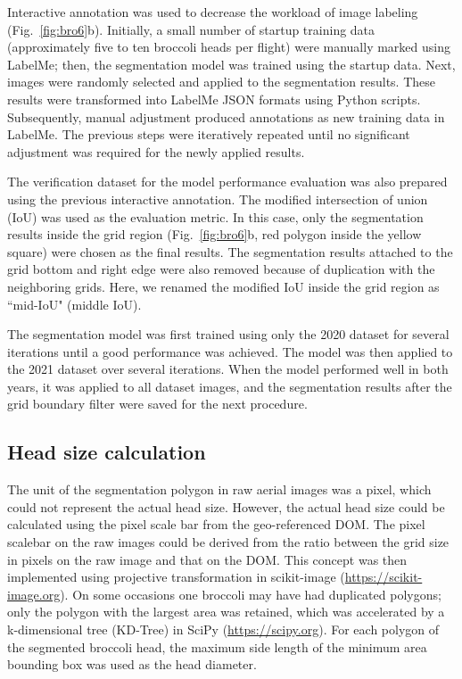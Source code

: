 Interactive annotation was used to decrease the workload of image labeling \linebreak (Fig.~\ref{fig:bro6}b). Initially, a small number of startup training data (approximately five to ten broccoli heads per flight) were manually marked using LabelMe; then, the segmentation model was trained using the startup data. Next, images were randomly selected and applied to the segmentation results. These results were transformed into LabelMe JSON formats using Python scripts. Subsequently, manual adjustment produced annotations as new training data in LabelMe. The previous steps were iteratively repeated until no significant adjustment was required for the newly applied results.

The verification dataset for the model performance evaluation was also prepared using the previous interactive annotation. The modified intersection of union (IoU) was used as the evaluation metric. In this case, only the segmentation results inside the grid region (Fig.~\ref{fig:bro6}b, red polygon inside the yellow square) were chosen as the final results. The segmentation results attached to the grid bottom and right edge were also removed because of duplication with the neighboring grids. Here, we renamed the modified IoU inside the grid region as ``mid-IoU" (middle IoU).

The segmentation model was first trained using only the 2020 dataset for several iterations until a good performance was achieved. The model was then applied to the 2021 dataset over several iterations. When the model performed well in both years, it was applied to all dataset images, and the segmentation results after the grid boundary filter were saved for the next procedure.

\subsection{Head size calculation}

The unit of the segmentation polygon in raw aerial images was a pixel, which could not represent the actual head size. However, the actual head size could be calculated using the pixel scale bar from the geo-referenced DOM. The pixel scalebar on the raw images could be derived from the ratio between the grid size in pixels on the raw image and that on the DOM. This concept was then implemented using projective transformation in scikit-image (\url{https://scikit-image.org}). On some occasions one broccoli may have had duplicated polygons; only the polygon with the largest area was retained, which was accelerated by a k-dimensional tree (KD-Tree) in SciPy (\url{https://scipy.org}). For each polygon of the segmented broccoli head, the maximum side length of the minimum area bounding box was used as the head diameter.


